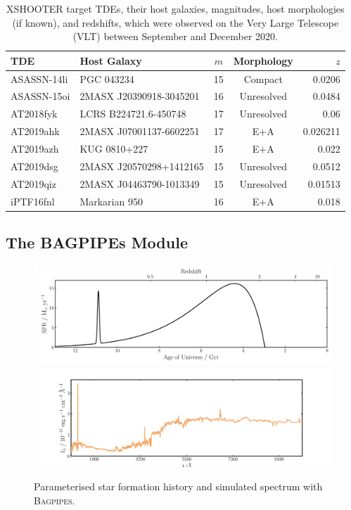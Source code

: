 \documentclass[a4paper,11pt]{article}
\begin{document}
\begin{table}[H]
  \centering
  \begin{tabular}{l l c c r}
    TDE         & Host Galaxy             & $m$ & Morphology & $z$      \\
    \hline \hline
    ASASSN-14li & PGC 043234              & 15  & Compact    & 0.0206   \\
    ASASSN-15oi & 2MASX J20390918-3045201 & 16  & Unresolved & 0.0484   \\
    AT2018fyk   & LCRS B224721.6-450748   & 17  & Unresolved & 0.06     \\
    AT2019ahk   & 2MASX J07001137-6602251 & 17  & E+A        & 0.026211 \\
    AT2019azh   & KUG 0810+227            & 15  & E+A        & 0.022    \\
    AT2019dsg   & 2MASX J20570298+1412165 & 15  & Unresolved & 0.0512   \\
    AT2019qiz   & 2MASX J04463790-1013349 & 15  & Unresolved & 0.01513  \\
    iPTF16fnl   & Markarian 950           & 16  & E+A        & 0.018    \\
    \hline
  \end{tabular}
  \caption{XSHOOTER target TDEs, their host galaxies, magnitudes, host morphologies (if known), and redshifts, which were observed on the Very Large Telescope (VLT) between September and December 2020.\cite{Zwicky_1975, Jose_2014, Holoien_2016a, Arcavi_2015, Holoien_2016b, Wevers_2021, Cacella_2019, Holoien_2019, van_Velzen_2019, Perez_Torres_2019, Seibert_2019, Gezari_2016, Blagorodnova_2017}}
  \label{tab:xshooter_data}
\end{table}

\subsection{The BAGPIPEs Module}\label{sec:bagpipes_module}

\begin{figure}
  \includegraphics[width=\textwidth]{alex_model_20_sfh}
  \includegraphics[width=\textwidth]{alex_model_20_spec}
  \caption{Parameterised star formation history and simulated spectrum with \textsc{Bagpipes}.}
  \label{fig:bagpipes_example_simulation}
\end{figure}
\end{document}
